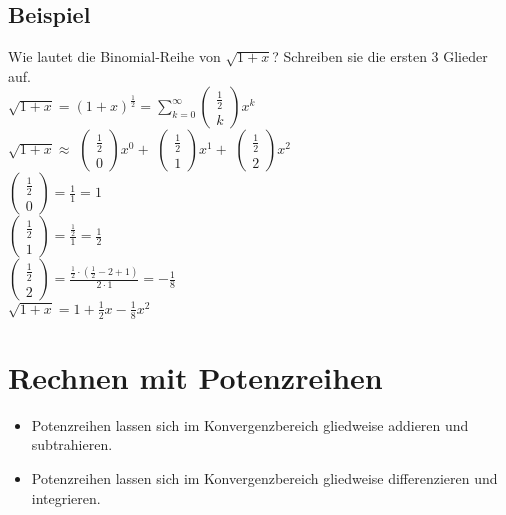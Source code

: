 \documentclass[../main.tex]{subfiles}
\begin{document}
\subsection{Beispiel}
Wie lautet die Binomial-Reihe von $\sqrt{1+x}$? Schreiben sie die ersten 3 Glieder auf. \\
$\sqrt{1+x}=(1+x)^\frac{1}{2}=\sum\limits_{k=0}^\infty\begin{pmatrix}\frac{1}{2} \\k\end{pmatrix}x^k$ \\[7pt]
$\sqrt{1+x}\approx$
$\begin{pmatrix}\frac{1}{2} \\0\end{pmatrix}x^0+$
$\begin{pmatrix}\frac{1}{2} \\1\end{pmatrix}x^1+$
$\begin{pmatrix}\frac{1}{2} \\2\end{pmatrix}x^2$ \\ [7pt]
$\begin{pmatrix}\frac{1}{2} \\0\end{pmatrix} = \frac{1}{1} = 1$ \\ [7pt]
$\begin{pmatrix}\frac{1}{2} \\1\end{pmatrix}= \frac{\frac{1}{2}}{1} = \frac{1}{2}$ \\ [7pt]
$\begin{pmatrix}\frac{1}{2} \\2\end{pmatrix} = \frac{\frac{1}{2}\cdot (\frac{1}{2}-2+1)}{2\cdot 1} = -\frac{1}{8}$ \\ [7pt]
$\sqrt{1+x} = 1+\frac{1}{2}x-\frac{1}{8}x^2$

\section{Rechnen mit Potenzreihen}
\begin{itemize}
    \item Potenzreihen lassen sich im Konvergenzbereich gliedweise addieren und subtrahieren.
    \item Potenzreihen lassen sich im Konvergenzbereich gliedweise differenzieren und integrieren.
\end{itemize}
\end{document}
